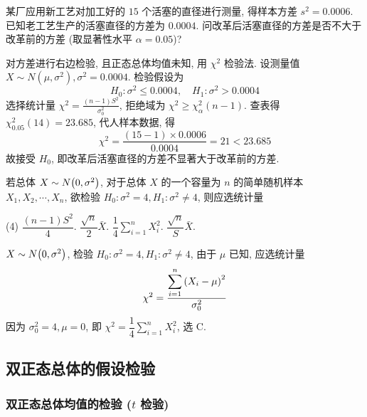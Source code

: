 \begin{example}
    某厂应用新工艺对加工好的 $15 $ 个活塞的直径进行测量, 得样本方差 $ s^{2}=  0.0006$.
    已知老工艺生产的活塞直径的方差为 $0.0004$. 问改革后活塞直径的方差是否不大于改革前的方差 (取显著性水平 $ \alpha=0.05$)?
\end{example}
\begin{solution}
    对方差进行右边检验, 且正态总体均值未知, 用 $ \chi^{2} $ 检验法.
    设测量值 $ X \sim N\left(\mu, \sigma^{2}\right), \sigma^{2}=0.0004 $.
    检验假设为
    $$H_{0}: \sigma^{2} \leqslant 0.0004, \quad H_{1}: \sigma^{2}>0.0004 $$
    选择统计量 $\displaystyle \chi^{2}=\frac{(n-1) S^{2}}{\sigma_{0}^{2}} $, 拒绝域为 $ \chi^{2} \geqslant \chi_{\alpha}^{2}(n-1) $.
    查表得 $ \chi_{0.05}^{2}(14)=23.685$, 代人样本数据, 得 $$\displaystyle \chi^{2}=\frac{(15-1) \times 0.0006}{0.0004}=21<23.685 $$
    故接受 $ H_{0} $, 即改革后活塞直径的方差不显著大于改革前的方差.
\end{solution}

\begin{example}
    若总体 $X\sim N\qty(0,\sigma^2)$, 对于总体 $X$ 的一个容量为 $n$ 的简单随机样本 $X_1, X_2, \cdots ,X_n$, 欲检验 $H_0:\sigma^2=4,H_1:\sigma^2\neq 4$, 则应选统计量
    \begin{tasks}(4)
        \task $\dfrac{(n-1)S^2}{4}$.
        \task $\dfrac{\sqrt{n}}{2}\bar{X}$.
        \task $\dfrac{1}{4}\displaystyle \sum_{i=1}^{n} X_i^2$.
        \task $\dfrac{\sqrt{n}}{S}\bar{X}$.
    \end{tasks}
\end{example}
\begin{solution}
    $X\sim N\qty(0,\sigma^2)$, 检验 $H_0:\sigma^2=4,H_1:\sigma^2\neq 4$, 由于 $\mu$ 已知, 应选统计量
    $$
        \chi^2=\dfrac{\displaystyle \sum_{i=1}^{n} \qty(X_i-\mu)^2}{\sigma_0^2}
    $$
    因为 $\sigma_0^2=4, \mu=0$, 即 $\chi^2=\displaystyle \dfrac{1}{4}\sum_{i=1}^{n} X_i^2$, 选 C.
\end{solution}

\subsection{双正态总体的假设检验}


\subsubsection{双正态总体均值的检验 (\texorpdfstring{$t$}. 检验)}

